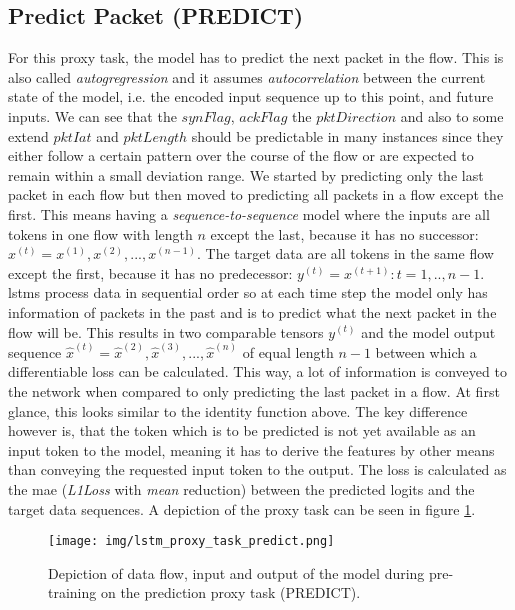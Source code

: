 \subsection{Predict Packet (PREDICT)} \label{sec:experiments:lstm:predict_packet}

For this proxy task, the model has to predict the next packet in the flow. This is also called \textit{autogregression} and it assumes \textit{autocorrelation} between the current state of the model, i.e. the encoded input sequence up to this point, and future inputs. We can see that the $synFlag$, $ackFlag$ the $pktDirection$ and also to some extend $pktIat$ and $pktLength$ should be predictable in many instances since they either follow a certain pattern over the course of the flow or are expected to remain within a small deviation range. We started by predicting only the last packet in each flow but then moved to predicting all packets in a flow except the first. This means having a \textit{sequence-to-sequence} model where the inputs are all tokens in one flow with length $n$ except the last, because it has no successor: $x^{(t)} = x^{(1)}, x^{(2)}, ..., x^{(n-1)}$. The target data are all tokens in the same flow except the first, because it has no predecessor: $y^{(t)} = x^{(t+1)} : t = 1,..,n-1$. \glspl{lstm} process data in sequential order so at each time step the model only has information of packets in the past and is to predict what the next packet in the flow will be. This results in two comparable tensors $y^{(t)}$ and the model output sequence $\hat{x}^{(t)} = \hat{x}^{(2)}, \hat{x}^{(3)}, ..., \hat{x}^{(n)}$ of equal length $n-1$ between which a differentiable loss can be calculated. This way, a lot of information is conveyed to the network when compared to only predicting the last packet in a flow. At first glance, this looks similar to the identity function above. The key difference however is, that the token which is to be predicted is not yet available as an input token to the model, meaning it has to derive the features by other means than conveying the requested input token to the output. The loss is calculated as the \gls{mae} (\textit{L1Loss} with \textit{mean} reduction) between the predicted logits and the target data sequences. A depiction of the proxy task can be seen in figure \ref{fig:experiments:lstm_proxy_task_predict}.

\begin{figure}[h]
	\centering
	\texttt{[image: img/lstm\_proxy\_task\_predict.png]}
	\caption{Depiction of data flow, input and output of the model during pre-training on the prediction proxy task (PREDICT). }
	\label{fig:experiments:lstm_proxy_task_predict}
\end{figure}

